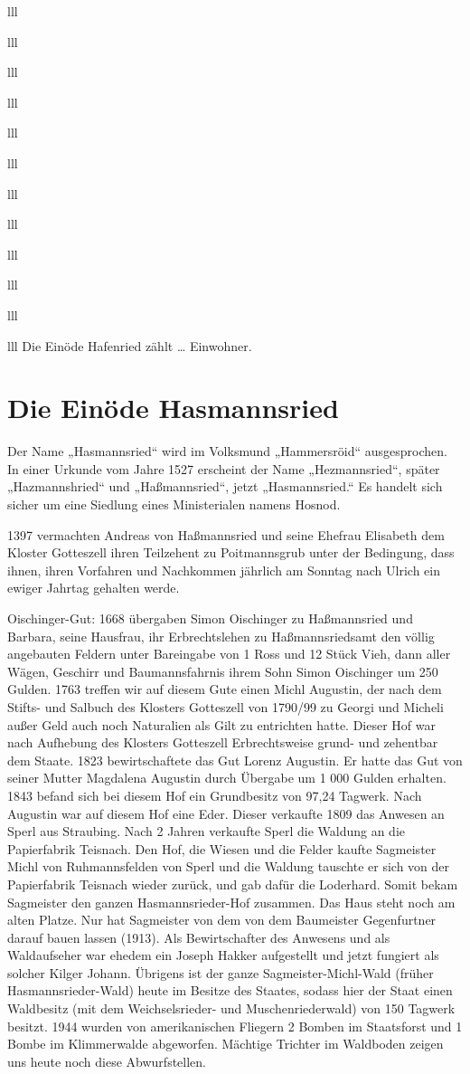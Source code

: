 \documentclass[12pt,a4pager]{book}
\begin{document}
\begin{tabuluar}{lll}
\begin{tabuluar}{lll}
\begin{tabuluar}{lll}
\begin{tabuluar}{lll}
\begin{tabuluar}{lll}
\begin{tabuluar}{lll}
\begin{tabuluar}{lll}
\begin{tabuluar}{lll}
\begin{tabuluar}{lll}
\begin{tabuluar}{lll}
\begin{tabuluar}{lll}
\begin{tabuluar}{lll}
Die Einöde Hafenried zählt … Einwohner.

\section{Die Einöde Hasmannsried}

Der Name „Hasmannsried“ wird im Volksmund „Hammersröid“ ausgesprochen. In einer
Urkunde vom Jahre 1527 erscheint der Name „Hezmannsried“, später „Hazmannshried“
und „Haßmannsried“, jetzt „Hasmannsried.“ Es handelt sich sicher um eine
Siedlung eines Ministerialen namens Hosnod.

1397 vermachten Andreas von Haßmannsried und seine Ehefrau Elisabeth dem Kloster
Gotteszell ihren Teilzehent zu Poitmannsgrub unter der Bedingung, dass ihnen,
ihren Vorfahren und Nachkommen jährlich am Sonntag nach Ulrich ein ewiger
Jahrtag gehalten werde.

Oischinger-Gut: 1668 übergaben Simon Oischinger zu Haßmannsried und Barbara,
seine Hausfrau, ihr Erbrechtslehen zu Haßmannsriedsamt den völlig angebauten
Feldern unter Bareingabe von 1 Ross und 12 Stück Vieh, dann aller Wägen,
Geschirr und Baumannsfahrnis ihrem Sohn Simon Oischinger um 250 Gulden. 1763
treffen wir auf diesem Gute einen Michl Augustin, der nach dem Stifts- und
Salbuch des Klosters Gotteszell von 1790/99 zu Georgi und Micheli außer Geld
auch noch Naturalien als Gilt zu entrichten hatte. Dieser Hof war nach Aufhebung
des Klosters Gotteszell Erbrechtsweise grund- und zehentbar dem Staate. 1823
bewirtschaftete das Gut Lorenz Augustin. Er hatte das Gut von seiner Mutter
Magdalena Augustin durch Übergabe um 1 000 Gulden erhalten. 1843 befand sich bei
diesem Hof ein Grundbesitz von 97,24 Tagwerk. Nach Augustin war auf diesem Hof
eine Eder. Dieser verkaufte 1809 das Anwesen an Sperl aus Straubing. Nach 2
Jahren verkaufte Sperl die Waldung an die Papierfabrik Teisnach. Den Hof, die
Wiesen und die Felder kaufte Sagmeister Michl von Ruhmannsfelden von Sperl und
die Waldung tauschte er sich von der Papierfabrik Teisnach wieder zurück, und
gab dafür die Loderhard. Somit bekam Sagmeister den ganzen Hasmannsrieder-Hof
zusammen. Das Haus steht noch am alten Platze. Nur hat Sagmeister von dem von
dem Baumeister Gegenfurtner darauf bauen lassen (1913). Als Bewirtschafter des
Anwesens und als Waldaufseher war ehedem ein Joseph Hakker aufgestellt und jetzt
fungiert als solcher Kilger Johann. Übrigens ist der ganze Sagmeister-Michl-Wald
(früher Hasmannsrieder-Wald) heute im Besitze des Staates, sodass hier der Staat
einen Waldbesitz (mit dem Weichselsrieder- und Muschenriederwald) von 150
Tagwerk besitzt. 1944 wurden von amerikanischen Fliegern 2 Bomben im Staatsforst
und 1 Bombe im Klimmerwalde abgeworfen. Mächtige Trichter im Waldboden zeigen
uns heute noch diese Abwurfstellen.


\end{tabuluar}
\end{tabuluar}
\end{tabuluar}
\end{tabuluar}
\end{tabuluar}
\end{tabuluar}
\end{tabuluar}
\end{tabuluar}
\end{tabuluar}
\end{tabuluar}
\end{tabuluar}
\end{tabuluar}
\end{document}
